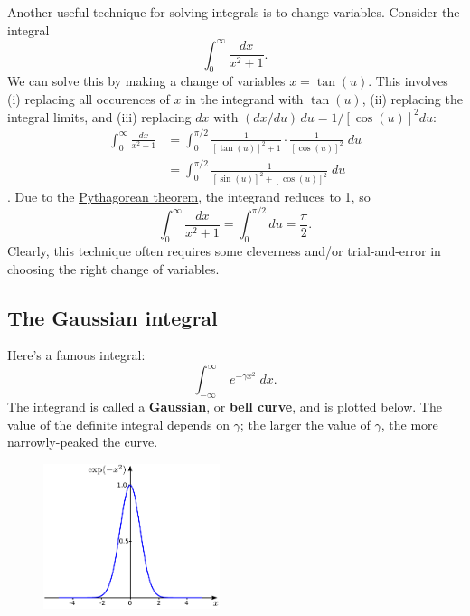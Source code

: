 \documentclass[10pt,a4paper]{article}
\begin{document}
Another useful technique for solving integrals is to change variables.
Consider the integral
\begin{equation}
\int_0^\infty \frac{dx}{x^2 + 1}.
\end{equation}
We can solve this by making a change of variables $x = \tan(u)$. This
involves (i) replacing all occurences of $x$ in the integrand with
$\tan(u)$, (ii) replacing the integral limits, and (iii) replacing
$dx$ with $(dx/du) \, du = 1/[\cos(u)]^2 du$:
\begin{align}
  \int_0^\infty \frac{dx}{x^2 + 1} &= \int_0^{\pi/2} \frac{1}{[\tan(u)]^2 + 1} \cdot \frac{1}{[\cos(u)]^2} \; du \\ &= \int_0^{\pi/2} \frac{1}{[\sin(u)]^2 + [\cos(u)]^2} \; du
\end{align}.
Due to the
\href{https://en.wikipedia.org/wiki/Pythagorean_theorem}{Pythagorean
theorem}, the integrand reduces to 1, so
\begin{equation}
\int_0^\infty \frac{dx}{x^2 + 1} = \int_0^{\pi/2} du = \frac{\pi}{2}.
\end{equation}
Clearly, this technique often requires some cleverness and/or
trial-and-error in choosing the right change of variables.

\subsection{The Gaussian integral}\label{the-gaussian-integral}

Here's a famous integral:
\begin{equation}
\int_{-\infty}^\infty \; e^{-\gamma x^2} \; dx.
\end{equation}
The integrand is called a \textbf{Gaussian}, or \textbf{bell curve}, and
is plotted below. The value of the definite integral depends on
$\gamma$; the larger the value of $\gamma$, the more narrowly-peaked
the curve.

\begin{figure}[h]
  \centering\includegraphics[width=0.46\textwidth]{gaussian}
\end{figure}
\end{document}
